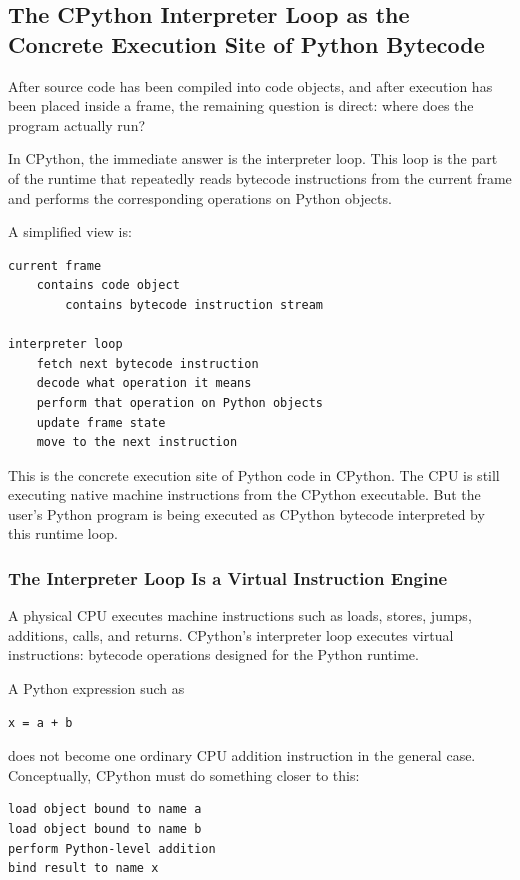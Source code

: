 \subsection{The CPython Interpreter Loop as the Concrete Execution Site of Python Bytecode}

After source code has been compiled into code objects, and after execution has been placed inside a frame, the remaining question is direct: where does the program actually run?

In CPython, the immediate answer is the interpreter loop. This loop is the part of the runtime that repeatedly reads bytecode instructions from the current frame and performs the corresponding operations on Python objects.

A simplified view is:

\begin{verbatim}
current frame
    contains code object
        contains bytecode instruction stream

interpreter loop
    fetch next bytecode instruction
    decode what operation it means
    perform that operation on Python objects
    update frame state
    move to the next instruction
\end{verbatim}

This is the concrete execution site of Python code in CPython. The CPU is still executing native machine instructions from the CPython executable. But the user's Python program is being executed as CPython bytecode interpreted by this runtime loop.

\subsubsection{The Interpreter Loop Is a Virtual Instruction Engine}

A physical CPU executes machine instructions such as loads, stores, jumps, additions, calls, and returns. CPython's interpreter loop executes virtual instructions: bytecode operations designed for the Python runtime.

A Python expression such as

\begin{verbatim}
x = a + b
\end{verbatim}

does not become one ordinary CPU addition instruction in the general case. Conceptually, CPython must do something closer to this:

\begin{verbatim}
load object bound to name a
load object bound to name b
perform Python-level addition
bind result to name x
\end{verbatim}

